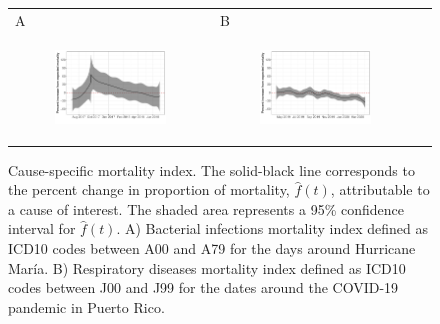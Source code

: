 \documentclass[11pt]{article}
\begin{document}
\begin{figure}[ht]
	\begin{tabular}{lll}
	A&B\\
	\begin{subfigure}[t]{0.49\linewidth}
		\centering
		\includegraphics[width=1\linewidth]{figs/figure-4a.pdf} 
	\end{subfigure}&
	\begin{subfigure}[t]{0.49\linewidth}
		\centering
		\includegraphics[width=1\linewidth]{figs/figure-4b.pdf}
	\end{subfigure}&\\
    \end{tabular}
	\caption{Cause-specific mortality index. The solid-black line corresponds to the percent change in proportion of mortality, $\hat{f}(t)$, attributable to a cause of interest. The shaded area represents a 95\% confidence interval for $\hat{f}(t)$. A) Bacterial infections mortality index defined as ICD10 codes between A00 and A79 for the days around Hurricane Mar\'ia. B) Respiratory diseases mortality index defined as ICD10 codes between J00 and J99 for the dates around the COVID-19 pandemic in Puerto Rico.}
	\label{fig:fhat-bacteria}
\end{figure}
\end{document}
